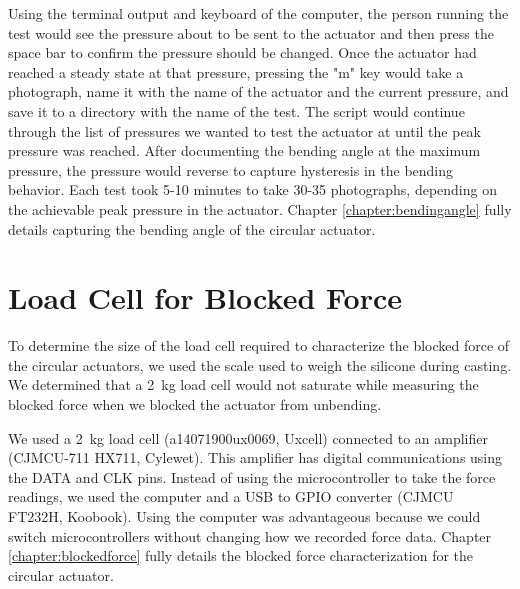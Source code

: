 Using the terminal output and keyboard of the computer, the person running the test would see the pressure about to be sent to the actuator and then press the space bar to confirm the pressure should be changed. Once the actuator had reached a steady state at that pressure, pressing the "m" key would take a photograph, name it with the name of the actuator and the current pressure, and save it to a directory with the name of the test. The script would continue through the list of pressures we wanted to test the actuator at until the peak pressure was reached. After documenting the bending angle at the maximum pressure, the pressure would reverse to capture hysteresis in the bending behavior. Each test took 5-10 minutes to take 30-35 photographs, depending on the achievable peak pressure in the actuator. Chapter \ref{chapter:bendingangle} fully details capturing the bending angle of the circular actuator. 

\section{Load Cell for Blocked Force}

To determine the size of the load cell required to characterize the blocked force of the circular actuators, we used the scale used to weigh the silicone during casting. We determined that a 2~kg load cell would not saturate while measuring the blocked force when we blocked the actuator from unbending. 

We used a 2~kg load cell (a14071900ux0069, Uxcell) connected to an amplifier (CJMCU-711 HX711, Cylewet). This amplifier has digital communications using the DATA and CLK pins. Instead of using the microcontroller to take the force readings, we used the computer and a USB to GPIO converter (CJMCU FT232H, Koobook). Using the computer was advantageous because we could switch microcontrollers without changing how we recorded force data. Chapter \ref{chapter:blockedforce} fully details the blocked force characterization for the circular actuator. 



